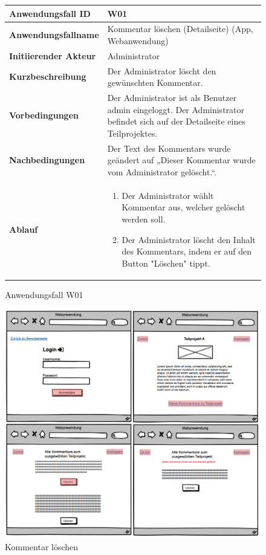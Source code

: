 \begin{figure}[h]
	\centering
	\begin{tabularx}{\textwidth}{ X | X }
		\textbf{Anwendungsfall ID} & W01 \\ \hline
		\textbf{Anwendungsfallname} & Kommentar löschen (Detailseite) (App, Webanwendung) \\ \hline
		\textbf{Initiierender Akteur} & Administrator\\ \hline
		\textbf{Kurzbeschreibung} & Der Administrator löscht den gewünschten Kommentar.  \\ \hline
		\textbf{Vorbedingungen} & Der Administrator ist als Benutzer admin eingeloggt. Der Administrator befindet sich auf der Detailseite eines Teilprojektes.  \\ \hline
		\textbf{Nachbedingungen} & Der Text des Kommentars wurde geändert auf „Dieser Kommentar wurde vom Administrator gelöscht.“.  \\ \hline
		\textbf{Ablauf} &
			\begin{enumerate}
				\item Der Administrator wählt Kommentar aus, welcher gelöscht werden soll.
				\item Der Administrator löscht den Inhalt des Kommentars, indem er auf den Button "Löschen" tippt.
			\end{enumerate} \\ \hline
	\end{tabularx}
	\caption{Anwendungsfall W01}
	\label{fig:anwendungsfall-app-tabelle-xx-1}
\end{figure}

\begin{figure}[h]
	\centering
	\includegraphics[width=\textwidth]{img/MUdelete.png}			
	\caption{Kommentar löschen}
	\label{fig:anwendungsfalldiagramm-app}
\end{figure}


